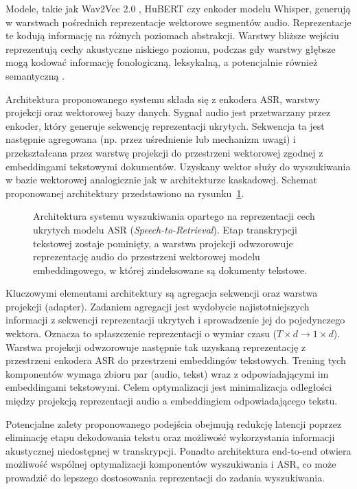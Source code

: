 Modele, takie jak Wav2Vec 2.0 \cite{baevski2020wav2vec}, HuBERT \cite{hsu2021hubert} czy enkoder modelu Whisper, generują w warstwach pośrednich reprezentacje wektorowe segmentów audio. Reprezentacje te kodują informację na różnych poziomach abstrakcji. Warstwy bliższe wejściu reprezentują cechy akustyczne niskiego poziomu, podczas gdy warstwy głębsze mogą kodować informację fonologiczną, leksykalną, a potencjalnie również semantyczną \cite{pasad2021layer}.

Architektura proponowanego systemu składa się z enkodera ASR, warstwy projekcji oraz wektorowej bazy danych. Sygnał audio jest przetwarzany przez enkoder, który generuje sekwencję reprezentacji ukrytych. Sekwencja ta jest następnie agregowana (np. przez uśrednienie lub mechanizm uwagi) i przekształcana przez warstwę projekcji do przestrzeni wektorowej zgodnej z embeddingami tekstowymi dokumentów. Uzyskany wektor służy do wyszukiwania w bazie wektorowej analogicznie jak w architekturze kaskadowej. Schemat proponowanej architektury przedstawiono na rysunku~\ref{fig:s2rArchitecture}.

\begin{figure}[htbp]
    \centering
    \caption{Architektura systemu wyszukiwania opartego na reprezentacji cech ukrytych modelu ASR (\textit{Speech-to-Retrieval}). Etap transkrypcji tekstowej zostaje pominięty, a warstwa projekcji odwzorowuje reprezentację audio do przestrzeni wektorowej modelu embeddingowego, w której zindeksowane są dokumenty tekstowe.}
    \label{fig:s2rArchitecture}
\end{figure}

Kluczowymi elementami architektury są agregacja sekwencji oraz warstwa projekcji (adapter). Zadaniem agregacji jest wydobycie najistotniejszych informacji z sekwencji reprezentacji ukrytych i sprowadzenie jej do pojedynczego wektora. Oznacza to spłaszczenie reprezentacji o wymiar czasu ($T \times d \rightarrow 1 \times d$). Warstwa projekcji odwzorowuje następnie tak uzyskaną reprezentację z przestrzeni enkodera ASR do przestrzeni embeddingów tekstowych. Trening tych komponentów wymaga zbioru par (audio, tekst) wraz z odpowiadającymi im embeddingami tekstowymi. Celem optymalizacji jest minimalizacja odległości między projekcją reprezentacji audio a embeddingiem odpowiadającego tekstu.

Potencjalne zalety proponowanego podejścia obejmują redukcję latencji poprzez eliminację etapu dekodowania tekstu oraz możliwość wykorzystania informacji akustycznej niedostępnej w transkrypcji. Ponadto architektura end-to-end otwiera możliwość wspólnej optymalizacji komponentów wyszukiwania i ASR, co może prowadzić do lepszego dostosowania reprezentacji do zadania wyszukiwania.

